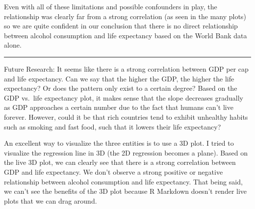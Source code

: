 \documentclass[
]{article}
\begin{document}
Even with all of these limitations and possible confounders in play, the
relationship was clearly far from a strong correlation (as seen in the
many plots) so we are quite confident in our conclusion that there is no
direct relationship between alcohol consumption and life expectancy
based on the World Bank data alone.

\begin{center}\rule{0.5\linewidth}{0.5pt}\end{center}

Future Research: It seems like there is a strong correlation between GDP
per cap and life expectancy. Can we say that the higher the GDP, the
higher the life expectancy? Or does the pattern only exist to a certain
degree? Based on the GDP vs.~life expectancy plot, it makes sense that
the slope decreases gradually as GDP approaches a certain number due to
the fact that humans can't live forever. However, could it be that rich
countries tend to exhibit unhealthy habits such as smoking and fast
food, such that it lowers their life expectancy? \newpage

An excellent way to visualize the three entities is to use a 3D plot. I
tried to visualize the regression line in 3D (the 2D regression becomes
a plane). Based on the live 3D plot, we can clearly see that there is a
strong correlation between GDP and life expectancy. We don't observe a
strong positive or negative relationship between alcohol consumption and
life expectancy. That being said, we can't see the benefits of the 3D
plot because R Markdown doesn't render live plots that we can drag
around.
\end{document}
